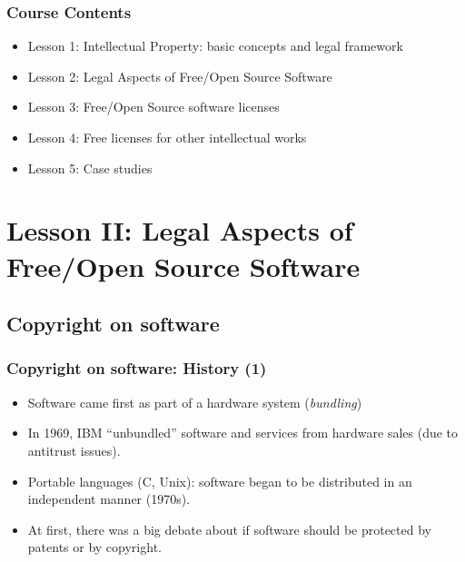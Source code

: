 
\begin{frame}
  \frametitle{Course Contents}

  \begin{itemize}
    \item Lesson 1: Intellectual Property: basic concepts and legal framework
    \item \alert{Lesson 2: Legal Aspects of Free/Open Source Software}
    \item Lesson 3: Free/Open Source software licenses
    \item Lesson 4: Free licenses for other intellectual works
    \item Lesson 5: Case studies
  \end{itemize}

\end{frame}



\section{Lesson II: Legal Aspects of Free/Open Source Software}

\subsection{Copyright on software}

\begin{frame}
\frametitle{Copyright on software: History (1)}

\begin{itemize}
\item Software came first as part of a hardware system (\emph{bundling})
\item In 1969, IBM ``unbundled'' software and services from hardware sales (due to antitrust issues).
\item Portable languages (C, Unix): software began to be distributed in an independent manner (1970s).
\item At first, there was a big debate about if software should be protected
by patents or by copyright.
\end{itemize}

\end{frame}


